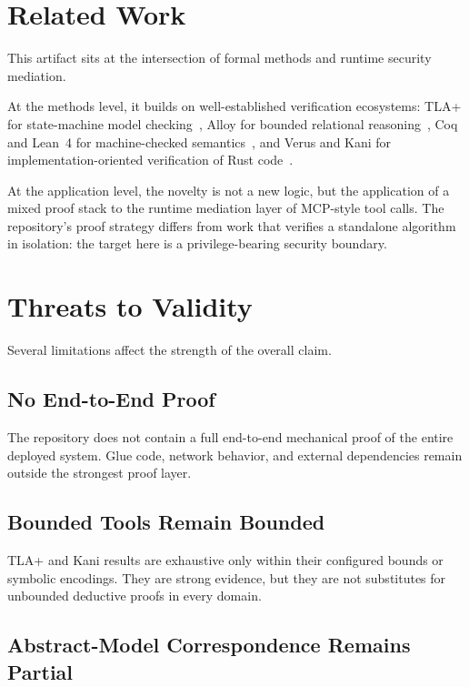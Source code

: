 \documentclass[11pt]{article}
\begin{document}
\section{Related Work}

This artifact sits at the intersection of formal methods and runtime security
mediation.

At the methods level, it builds on well-established verification ecosystems:
TLA+ for state-machine model checking~\cite{lamport94,lamport02}, Alloy for
bounded relational reasoning~\cite{jackson12}, Coq and Lean~4 for
machine-checked semantics~\cite{coq,lean4}, and Verus and Kani for
implementation-oriented verification of Rust code~\cite{verus,kani}.

At the application level, the novelty is not a new logic, but the application
of a mixed proof stack to the runtime mediation layer of MCP-style tool calls.
The repository's proof strategy differs from work that verifies a standalone
algorithm in isolation: the target here is a privilege-bearing security
boundary.

\section{Threats to Validity}

Several limitations affect the strength of the overall claim.

\subsection{No End-to-End Proof}

The repository does not contain a full end-to-end mechanical proof of the
entire deployed system. Glue code, network behavior, and external dependencies
remain outside the strongest proof layer.

\subsection{Bounded Tools Remain Bounded}

TLA+ and Kani results are exhaustive only within their configured bounds or
symbolic encodings. They are strong evidence, but they are not substitutes for
unbounded deductive proofs in every domain.

\subsection{Abstract-Model Correspondence Remains Partial}
\end{document}

